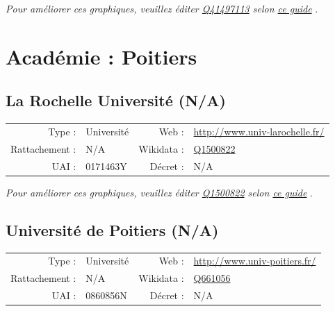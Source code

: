 \documentclass[12pt,french,landscape]{article}
\begin{document}
\textit{\scriptsize Pour améliorer ces graphiques, veuillez éditer \href{https://www.wikidata.org/entity/Q41497113}{Q41497113}  selon \href{https://github.com/cpesr/wikidataESR/blob/master/Rmd/wikidataESR.md}{ce guide}}
.


\newpage

\hypertarget{acaduxe9mie-poitiers}{%
\section{Académie : Poitiers}\label{acaduxe9mie-poitiers}}

\hypertarget{la-rochelle-universituxe9-na}{%
\subsection{La Rochelle Université
(N/A)}\label{la-rochelle-universituxe9-na}}

\begin{tabular*}{0.45\textwidth}{rp{2cm}rl}  
\hline  
Type : & Université & Web : &\href{http://www.univ-larochelle.fr/}{http://www.univ-larochelle.fr/} \\  
Rattachement : & N/A & Wikidata : & \href{https://www.wikidata.org/entity/Q1500822}{Q1500822} \\  
UAI : & 0171463Y & Décret : & N/A \\  
\hline  
\end{tabular*}

\textit{\scriptsize Pour améliorer ces graphiques, veuillez éditer \href{https://www.wikidata.org/entity/Q1500822}{Q1500822}  selon \href{https://github.com/cpesr/wikidataESR/blob/master/Rmd/wikidataESR.md}{ce guide}}
.


\newpage

\hypertarget{universituxe9-de-poitiers-na}{%
\subsection{Université de Poitiers
(N/A)}\label{universituxe9-de-poitiers-na}}

\begin{tabular*}{0.45\textwidth}{rp{2cm}rl}  
\hline  
Type : & Université & Web : &\href{http://www.univ-poitiers.fr/}{http://www.univ-poitiers.fr/} \\  
Rattachement : & N/A & Wikidata : & \href{https://www.wikidata.org/entity/Q661056}{Q661056} \\  
UAI : & 0860856N & Décret : & N/A \\  
\hline  
\end{tabular*}
\end{document}
